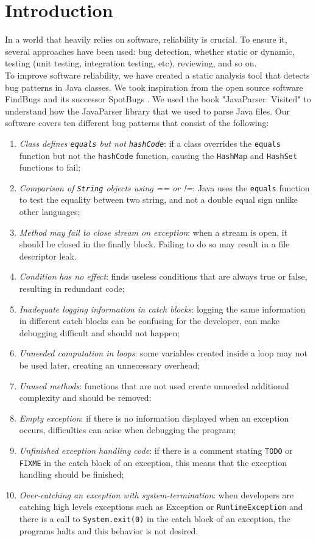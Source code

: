 \documentclass[sigconf]{acmart}
\begin{document}
\section{Introduction}
In a world that heavily relies on software, reliability is crucial. To ensure it, several approaches have been used: bug detection, whether static or dynamic, testing (unit testing, integration testing, etc), reviewing, and so on.\\To improve software reliability, we have created a static analysis tool that detects bug patterns in Java classes. We took inspiration from the open source software FindBugs \cite{findbugs} and its successor SpotBugs \cite{spotbugs}. We used the book "JavaParser: Visited" \cite{javaparservisited} to understand how the JavaParser \cite{javaparser} library that we used to parse Java files. Our software covers ten different bug patterns that consist of the following:
\begin{enumerate}
    \item \textit{Class defines \texttt{equals} but not \texttt{hashCode}}: if a class overrides the \texttt{equals} function but not the \texttt{hashCode} function, causing the \texttt{HashMap} and \texttt{HashSet} functions to fail;
    \item \textit{Comparison of \texttt{String} objects using == or !=}: Java uses the \texttt{equals} function to test the equality between two string, and not a double equal sign unlike other languages;
    \item \textit{Method may fail to close stream on exception}: when a stream is open, it should be closed in the finally block. Failing to do so may result in a file descriptor leak.
    \item \textit{Condition has no effect}: finds useless conditions that are always true or false, resulting in redundant code;
    \item \textit{Inadequate logging information in catch blocks}: logging the same information in different catch blocks can be confusing for the developer, can make debugging difficult and should not happen;
    \item \textit{Unneeded computation in loops}: some variables created inside a loop may not be used later, creating an unnecessary overhead;
    \item \textit{Unused methods}: functions that are not used create unneeded additional complexity and should be removed:
    \item \textit{Empty exception}: if there is no information displayed when an exception occurs, difficulties can arise when debugging the program;
    \item \textit{Unfinished exception handling code}: if there is a comment stating \texttt{TODO} or \texttt{FIXME} in the catch block of an exception, this means that the exception handling should be finished;
    \item \textit{Over-catching an exception with system-termination}: when developers are catching high levels exceptions such as Exception or \texttt{RuntimeException} and there is a call to \texttt{System.\-exit(0)} in the catch block of an exception, the programs halts and this behavior is not desired.
\end{enumerate}
\end{document}
